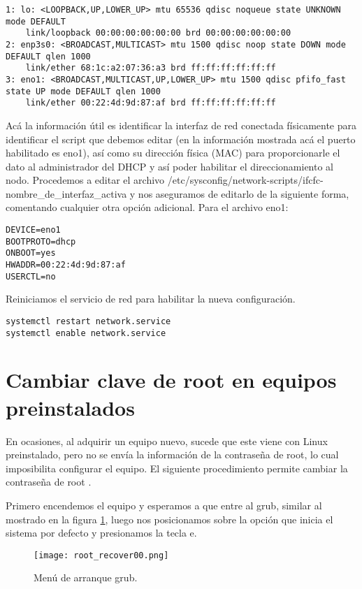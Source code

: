 \begin{lstlisting} 
1: lo: <LOOPBACK,UP,LOWER_UP> mtu 65536 qdisc noqueue state UNKNOWN mode DEFAULT 
    link/loopback 00:00:00:00:00:00 brd 00:00:00:00:00:00
2: enp3s0: <BROADCAST,MULTICAST> mtu 1500 qdisc noop state DOWN mode DEFAULT qlen 1000
    link/ether 68:1c:a2:07:36:a3 brd ff:ff:ff:ff:ff:ff
3: eno1: <BROADCAST,MULTICAST,UP,LOWER_UP> mtu 1500 qdisc pfifo_fast state UP mode DEFAULT qlen 1000
    link/ether 00:22:4d:9d:87:af brd ff:ff:ff:ff:ff:ff
\end{lstlisting}
Acá la información útil es identificar la interfaz de red conectada físicamente para identificar el script que debemos editar (en la información mostrada acá el puerto habilitado es eno1), así como su dirección física (MAC) para proporcionarle el dato al administrador del DHCP y así poder habilitar el direccionamiento al nodo. Procedemos a editar el archivo /etc/sysconfig/network-scripts/ifcfc-nombre\_de\_interfaz\_activa y nos aseguramos de editarlo de la siguiente forma, comentando cualquier otra opción adicional. Para el archivo eno1:

\begin{lstlisting} 
DEVICE=eno1
BOOTPROTO=dhcp
ONBOOT=yes
HWADDR=00:22:4d:9d:87:af
USERCTL=no
\end{lstlisting}

Reiniciamos el servicio de red para habilitar la nueva configuración.

\begin{lstlisting} 
systemctl restart network.service
systemctl enable network.service
\end{lstlisting}

\section{Cambiar clave de root en equipos preinstalados}
En ocasiones, al adquirir un equipo nuevo, sucede que este viene con Linux preinstalado, pero no se envía la información de la contraseña de root, lo cual imposibilita configurar el equipo. El siguiente procedimiento permite cambiar la contraseña de root \cite{rootrecover}.

Primero encendemos el equipo y esperamos a que entre al grub, similar al mostrado en la figura \ref{fig:rootrecover:00}, luego nos posicionamos sobre la opción que inicia el sistema por defecto y presionamos la tecla e. 

\begin{figure}[H]
\centering
\texttt{[image: root\_recover00.png]}
\caption{Menú de arranque grub.}
\label{fig:rootrecover:00}
\end{figure}


